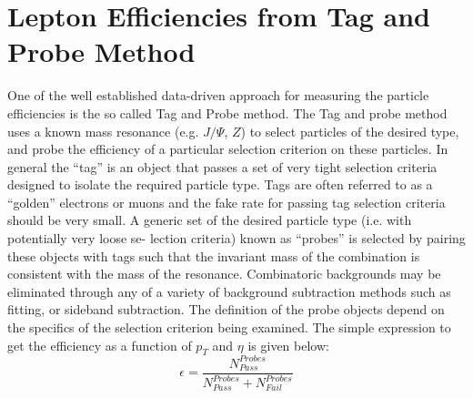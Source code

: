 \section{Lepton Efficiencies from Tag and Probe Method}
\label{TP}
One of the well established data-driven approach for measuring the particle efficiencies is the
so called Tag and Probe method. The Tag and probe method uses a known mass resonance (e.g. $J/\Psi$, $Z$) to select particles of the desired type, and probe the efficiency of a particular
selection criterion on these particles. In general the “tag” is an object that passes a set of very
tight selection criteria designed to isolate the required particle type. Tags are often referred
to as a “golden” electrons or muons and the fake rate for passing tag selection criteria should
be very small. A generic set of the desired particle type (i.e. with potentially very loose se-
lection criteria) known as “probes” is selected by pairing these objects with tags such that the
invariant mass of the combination is consistent with the mass of the resonance. Combinatoric
backgrounds may be eliminated through any of a variety of background subtraction methods
such as fitting, or sideband subtraction. The definition of the probe objects depend on the specifics of the selection criterion being examined. The simple expression to get the efficiency as a function of $p_T$ and $\eta$ is given below:
\begin{equation}
\epsilon=\frac{N_{Pass}^{Probes}}{N_{Pass}^{Probes}+N_{Fail}^{Probes}}
\end{equation}

